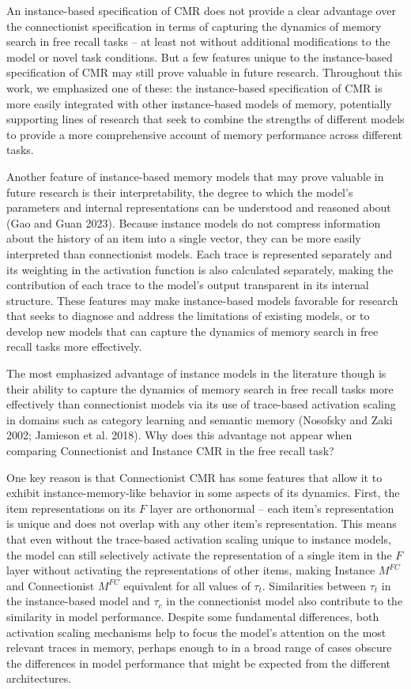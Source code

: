 \documentclass[
  letterpaper,
  11pt,
  english,
  singlespacing,
  headsepline]{MastersDoctoralThesis}
\begin{document}
An instance-based specification of CMR does not provide a clear
advantage over the connectionist specification in terms of capturing the
dynamics of memory search in free recall tasks -- at least not without
additional modifications to the model or novel task conditions. But a
few features unique to the instance-based specification of CMR may still
prove valuable in future research. Throughout this work, we emphasized
one of these: the instance-based specification of CMR is more easily
integrated with other instance-based models of memory, potentially
supporting lines of research that seek to combine the strengths of
different models to provide a more comprehensive account of memory
performance across different tasks.

Another feature of instance-based memory models that may prove valuable
in future research is their interpretability, the degree to which the
model's parameters and internal representations can be understood and
reasoned about (Gao and Guan 2023). Because instance models do not
compress information about the history of an item into a single vector,
they can be more easily interpreted than connectionist models. Each
trace is represented separately and its weighting in the activation
function is also calculated separately, making the contribution of each
trace to the model's output transparent in its internal structure. These
features may make instance-based models favorable for research that
seeks to diagnose and address the limitations of existing models, or to
develop new models that can capture the dynamics of memory search in
free recall tasks more effectively.

The most emphasized advantage of instance models in the literature
though is their ability to capture the dynamics of memory search in free
recall tasks more effectively than connectionist models via its use of
trace-based activation scaling in domains such as category learning and
semantic memory (Nosofsky and Zaki 2002; Jamieson et al. 2018). Why does
this advantage not appear when comparing Connectionist and Instance CMR
in the free recall task?

One key reason is that Connectionist CMR has some features that allow it
to exhibit instance-memory-like behavior in some aspects of its
dynamics. First, the item representations on its \(F\) layer are
orthonormal -- each item's representation is unique and does not overlap
with any other item's representation. This means that even without the
trace-based activation scaling unique to instance models, the model can
still selectively activate the representation of a single item in the
\(F\) layer without activating the representations of other items,
making Instance \(M^{FC}\) and Connectionist \(M^{FC}\) equivalent for
all values of \(\tau_{t}\). Similarities between \(\tau_{t}\) in the
instance-based model and \(\tau_{c}\) in the connectionist model also
contribute to the similarity in model performance. Despite some
fundamental differences, both activation scaling mechanisms help to
focus the model's attention on the most relevant traces in memory,
perhaps enough to in a broad range of cases obscure the differences in
model performance that might be expected from the different
architectures.
\end{document}
